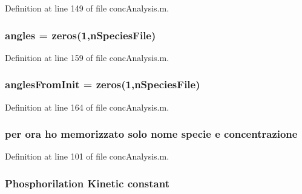Definition at line 149 of file conc\-Analysis.\-m.

\hypertarget{a00025_aee6c8457aab4cc643bbdaea8794ca74e}{
\subsubsection[{angles}]{\setlength{\rightskip}{0pt plus 5cm}angles = zeros(1,n\-Species\-File)}}\label{a00025_aee6c8457aab4cc643bbdaea8794ca74e}


Definition at line 159 of file conc\-Analysis.\-m.

\hypertarget{a00025_a860d662b73220f44f28099dfa9d3de76}{
\subsubsection[{angles\-From\-Init}]{\setlength{\rightskip}{0pt plus 5cm}angles\-From\-Init = zeros(1,n\-Species\-File)}}\label{a00025_a860d662b73220f44f28099dfa9d3de76}


Definition at line 164 of file conc\-Analysis.\-m.

\hypertarget{a00025_a5acf1fa9f8d0cb2ab8b1505ffd4dce5b}{
\subsubsection[{concentrazione}]{ per ora ho memorizzato solo nome specie e concentrazione}}\label{a00025_a5acf1fa9f8d0cb2ab8b1505ffd4dce5b}


Definition at line 101 of file conc\-Analysis.\-m.

\hypertarget{a00025_a163bb0e728c363ddfbd84725ee4bcbf1}{
\subsubsection[{constant}]{\setlength{\rightskip}{0pt plus 5cm}Phosphorilation Kinetic constant}}\label{a00025_a163bb0e728c363ddfbd84725ee4bcbf1}


